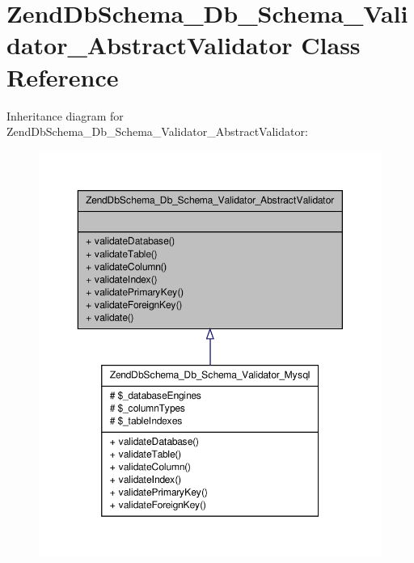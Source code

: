 \hypertarget{classZendDbSchema__Db__Schema__Validator__AbstractValidator}{\section{\-Zend\-Db\-Schema\-\_\-\-Db\-\_\-\-Schema\-\_\-\-Validator\-\_\-\-Abstract\-Validator \-Class \-Reference}
\label{classZendDbSchema__Db__Schema__Validator__AbstractValidator}
}


\-Inheritance diagram for \-Zend\-Db\-Schema\-\_\-\-Db\-\_\-\-Schema\-\_\-\-Validator\-\_\-\-Abstract\-Validator\-:\nopagebreak
\begin{figure}[H]
\begin{center}
\leavevmode
\includegraphics[width=350pt]{classZendDbSchema__Db__Schema__Validator__AbstractValidator__inherit__graph}
\end{center}
\end{figure}
